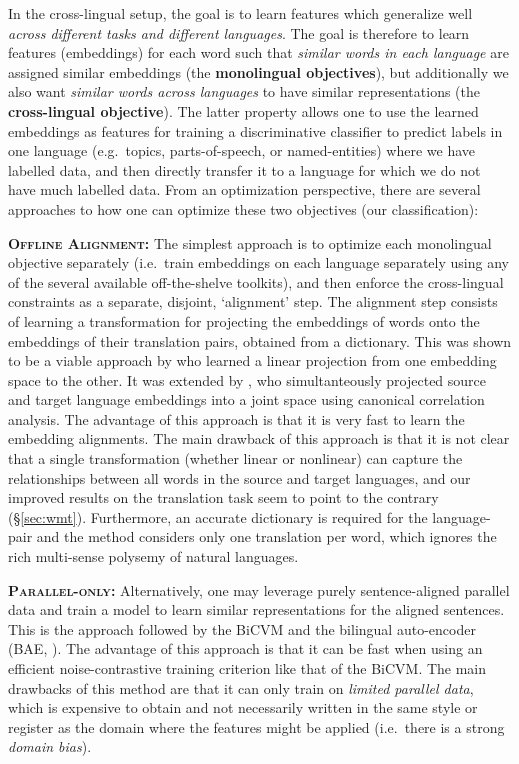 \documentclass[10pt]{article}
\newcommand\bld[1]{\textbf{#1}}
\begin{document}
In the cross-lingual setup, the goal is to learn features which generalize well
\emph{across different tasks and different languages}.  The goal is therefore
to learn features (embeddings) for each word 
such that \emph{similar words in each language} are assigned similar embeddings
(the \textbf{monolingual objectives}), but additionally we also want
\emph{similar words across languages} to have similar representations (the
\textbf{cross-lingual objective}). The latter property allows one to use the
learned embeddings as features for training a discriminative classifier to
predict labels in one language (e.g.\ topics, parts-of-speech, or
named-entities) where we have labelled data, and then directly transfer it to a
language for which we do not have much labelled data. From an optimization
perspective, there are several approaches to how one can optimize these two
objectives (our classification):

\textsc{\bld{Offline Alignment:}} The simplest approach is to optimize each
monolingual objective separately (i.e.\ train embeddings on each language
separately using any of the several available off-the-shelve toolkits), 
and then enforce the cross-lingual constraints as a separate,
disjoint, `alignment' step. The alignment step consists of learning a
transformation for projecting the embeddings of words onto the embeddings of their
translation pairs, obtained from a dictionary.  This was shown to be a viable
approach by \cite{mikolov2013exploiting} who learned a linear
projection from one embedding space to the other. It was extended by 
\cite{faruqui2014improving}, who simultanteously projected source and
target language embeddings into a joint space using canonical correlation
analysis. The advantage of this approach is that it is very fast to learn the
embedding alignments. The main drawback of this approach is that it is not
clear that a single transformation (whether linear or nonlinear) can capture
the relationships between all words in the source and target languages, and 
our improved results on the translation task seem to point to the contrary (\S \ref{sec:wmt}).
Furthermore, an accurate dictionary is required for the language-pair and the
method considers only one translation per word, which ignores the rich multi-sense
polysemy of natural languages.

\textsc{\bld{Parallel-only:}} Alternatively, one may leverage purely sentence-aligned
parallel data and train a model to learn similar representations for the
aligned sentences. This is the approach followed by the BiCVM \cite{hermann2013multilingual}
and the bilingual auto-encoder (BAE, \cite{chandar2014autoencoder}). 
The advantage of this approach is that it can be fast when using an efficient 
noise-contrastive training criterion like that of the BiCVM. The main drawbacks of
this method are that it can only train on \emph{limited parallel data}, which is
expensive to obtain and not necessarily written in the same style or register
as the domain where the features might be applied (i.e.\ there is a strong
\emph{domain bias}).
\end{document}
